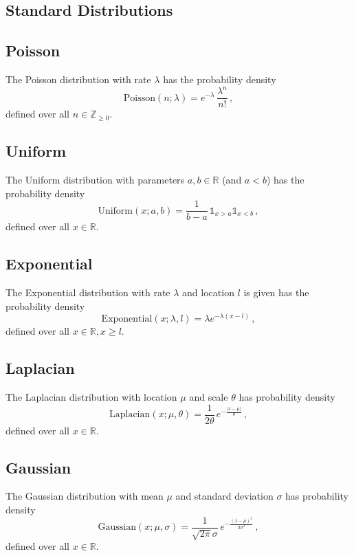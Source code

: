 \documentclass[12pt,letterpaper,onecolumn,oneside]{article}
\begin{document}
\begin{appendices}

\section{Standard Distributions}

\subsection{Poisson}

The Poisson distribution with rate $\lambda$ has the probability density
\[ \text{Poisson}(n; \lambda) =  e ^ {-\lambda}  \, \frac{  \lambda ^ n  }{n !} \,
, \]
defined over all $n \in \mathbb{Z}_{\ge 0}$.

\subsection{Uniform}

The Uniform distribution with parameters $a, b \in \mathbb{R}$ (and $a <
b$) has the probability density
\[ \text{Uniform}(x; a, b) = \frac{1}{b - a} \, \mathbb{1}_{x>a}
\mathbb{1}_{x<b}\, ,\]
defined over all $x \in \mathbb{R}$.

\subsection{Exponential}

The Exponential distribution with rate $\lambda$ and location $l$ is
given has the probability density
\[ \text{Exponential}(x; \lambda, l) = \lambda e^{-\lambda (x - l)} \,
,\]
defined over all $x \in \mathbb{R}, x \ge l$.

\subsection{Laplacian}

The Laplacian distribution with location $\mu$ and scale $\theta$ has
probability density
\[ \text{Laplacian}(x; \mu, \theta) = \frac{1}{2 \theta} \, 
e^{-\frac{|x - \mu|}{\theta}}
\, ,\]
defined over all $x \in \mathbb{R}$.

\subsection{Gaussian}

The Gaussian distribution with mean $\mu$ and standard deviation
$\sigma$ has probability density
\[ \text{Gaussian}(x; \mu, \sigma) = \frac{1}{\sqrt{2\pi}\sigma} \,
e^{-\frac{(x - \mu)^2}{2\sigma^2}} \, ,\] 
defined over all $x \in \mathbb{R}$.


\end{appendices}
\end{document}
